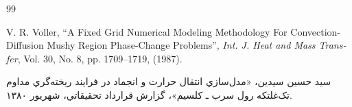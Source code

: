 \clearpage
\begin{thebibliography}{99}

\begin{latin}
V. R. Voller, ``A Fixed Grid Numerical Modeling Methodology For Convection-Diffusion Mushy Region Phase-Change Problems'', \textit{Int. J. Heat and Mass Transfer}, Vol. 30, No. 8, pp. 1709--1719, (1987).
\end{latin}

سيد حسين سيدين، «مدل‌سازي انتقال حرارت و انجماد در فرايند ريخته‌گري مداوم تک‌غلتکه رول سرب ـ کلسيم»، گزارش قرارداد تحقيقاتي، شهريور ۱۳۸۰.

\end{thebibliography}